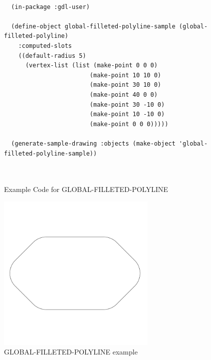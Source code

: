 \documentclass [11pt]{book}
\begin{document}
\begin{itemize}
\begin{figure}
\begin{lrbox}{\boxedverb}
\begin{minipage}{\linewidth}
{\begin{verbatim}

  (in-package :gdl-user)

  (define-object global-filleted-polyline-sample (global-filleted-polyline)
    :computed-slots
    ((default-radius 5)
      (vertex-list (list (make-point 0 0 0)
                        (make-point 10 10 0)
                        (make-point 30 10 0)
                        (make-point 40 0 0)
                        (make-point 30 -10 0)
                        (make-point 10 -10 0)
                        (make-point 0 0 0)))))

  (generate-sample-drawing :objects (make-object 'global-filleted-polyline-sample))

  
\end{verbatim}}
\end{minipage}
\end{lrbox}
\fbox{\usebox{\boxedverb}}

\caption{Example Code for GLOBAL-FILLETED-POLYLINE}

\label{fig:example-code-GLOBAL-FILLETED-POLYLINE}

\end{figure}

\begin{figure}
\begin{center}
\includegraphics[width=3in,height=3in]{../images/example-global-filleted-polyline.pdf}
\end{center}

\caption{GLOBAL-FILLETED-POLYLINE example}

\label{fig:GLOBAL-FILLETED-POLYLINE}

\end{figure}







\end{itemize}
\end{document}
